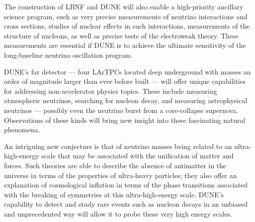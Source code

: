 The construction of LBNF and DUNE will also enable a high-priority ancillary science program, such as 
very precise measurements of neutrino interactions and cross sections, studies of nuclear effects in such interactions, measurements of the structure of nucleons, as well as precise tests of the electroweak theory. 
These measurements are essential if DUNE is to achieve the ultimate sensitivity of the long-baseline neutrino oscillation program. %

DUNE's far detector --- four LArTPCs located deep underground with masses an order of magnitude larger than ever before built  ---  %
will offer unique capabilities for addressing %
non-accelerator physics topics. These include measuring atmospheric neutrinos, searching for nucleon decay, and measuring astrophysical neutrinos --- possibly even %
the neutrino burst %
from a core-collapse supernova. 
Observations of these kinds will bring new insight into these fascinating natural phenomena. 


An intriguing %
new conjecture is that of neutrino masses being related to an %
ultra-high-energy scale that may be associated with the unification of matter and forces. Such theories are able to describe the absence of antimatter in the universe in terms of the properties of ultra-heavy particles; they also %
offer an explanation %
of cosmological inflation in terms of the phase transitions associated with the breaking of symmetries at this ultra-high-energy scale. DUNE's capability to detect and study rare events such as nucleon decays in an unbiased and unprecedented way will allow it to probe these very high energy scales. 


